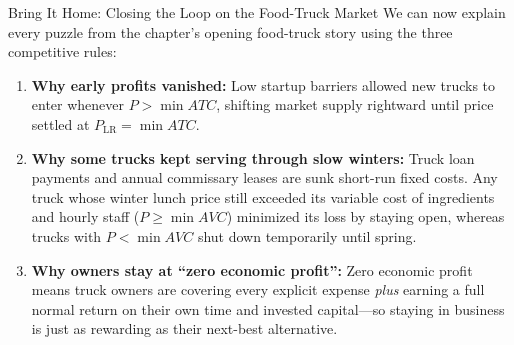 \documentclass[11pt,letterpaper]{article}
\begin{document}
\begin{examplecase}{Bring It Home: Closing the Loop on the Food-Truck Market}
We can now explain every puzzle from the chapter's opening food-truck story using the three competitive rules:
\begin{enumerate}
    \item \textbf{Why early profits vanished:} Low startup barriers allowed new trucks to enter whenever $P > \min ATC$, shifting market supply rightward until price settled at $P_{\text{LR}} = \min ATC$.
    \item \textbf{Why some trucks kept serving through slow winters:} Truck loan payments and annual commissary leases are sunk short-run fixed costs. Any truck whose winter lunch price still exceeded its variable cost of ingredients and hourly staff ($P \ge \min AVC$) minimized its loss by staying open, whereas trucks with $P < \min AVC$ shut down temporarily until spring.
    \item \textbf{Why owners stay at ``zero economic profit'':} Zero economic profit means truck owners are covering every explicit expense \emph{plus} earning a full normal return on their own time and invested capital—so staying in business is just as rewarding as their next-best alternative.
\end{enumerate}
\end{examplecase}
\end{document}
